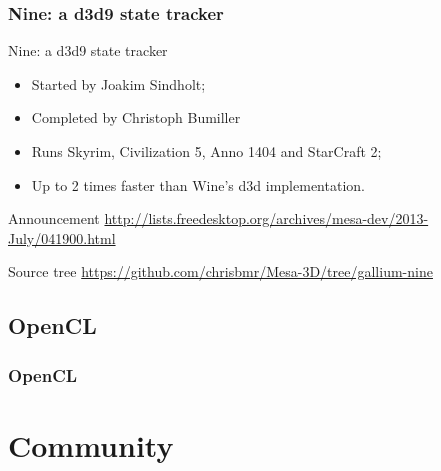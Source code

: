 \documentclass[11pt,english,compress]{beamer}
\begin{document}
\begin{frame}
	\frametitle{Nine: a d3d9 state tracker}

	\begin{block}{Nine: a d3d9 state tracker}
		\begin{itemize}
			\item Started by Joakim Sindholt;
			\item Completed by Christoph Bumiller
			\item Runs Skyrim, Civilization 5, Anno 1404 and StarCraft 2;
			\item Up to 2 times faster than Wine's d3d implementation.
		\end{itemize}
	\end{block}

	\begin{block}{Announcement}
		\url{http://lists.freedesktop.org/archives/mesa-dev/2013-July/041900.html}
	\end{block}

	\begin{block}{Source tree}
		\url{https://github.com/chrisbmr/Mesa-3D/tree/gallium-nine}
	\end{block}
\end{frame}

\subsection{OpenCL}
\begin{frame}
	\frametitle{OpenCL}


\end{frame}

\section{Community}
\end{document}
